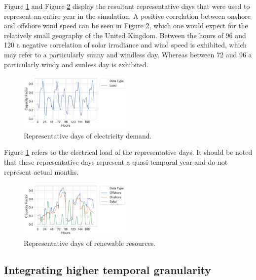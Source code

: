 \documentclass[final,3p,times,twocolumn,numbers]{elsarticle}
\begin{document}
Figure \ref{fig:clusters_compared_load} and Figure \ref{fig:clusters_compared_resources} display the resultant representative days that were used to represent an entire year in the simulation. A positive correlation between onshore and offshore wind speed can be seen in Figure \ref{fig:clusters_compared_resources}, which one would expect for the relatively small geography of the United Kingdom. Between the hours of 96 and 120 a negative correlation of solar irradiance and wind speed is exhibited, which may refer to a particularly sunny and windless day. Whereas between 72 and 96 a particularly windy and sunless day is exhibited.

\begin{figure}
\centering
\includegraphics[width=0.49\textwidth]{figures/methods_and_materials/clusters_results_load.pdf}
\caption{Representative days of electricity demand.}
\label{fig:clusters_compared_load}
\end{figure}

Figure \ref{fig:clusters_compared_load} refers to the electrical load of the representative days. It should be noted that these representative days represent a quasi-temporal year and do not represent actual months.


\begin{figure}
\centering
\includegraphics[width=0.49\textwidth]{figures/methods_and_materials/clusters_results_resources.pdf}
\caption{Representative days of renewable resources.}
\label{fig:clusters_compared_resources}
\end{figure}


\subsection{Integrating higher temporal granularity}
\end{document}

